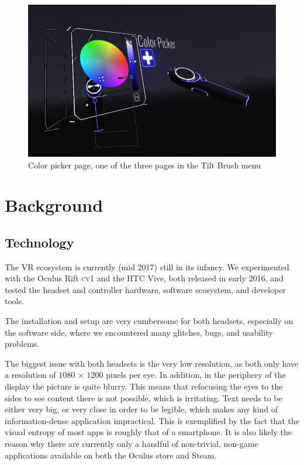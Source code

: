 \documentclass{tufte-book} %
\begin{document}
\begin{figure}
  \includegraphics{tiltbrushmenu.png}
  \caption{Color picker page, one of the three pages in the Tilt Brush menu}
  \label{fig:tiltbrushmenu}
\end{figure}



\chapter{Background}
\label{ch:background}

\section{Technology}
The \textsc{VR} ecosystem is currently (mid 2017) still in its infancy. We experimented with the Oculus Rift \textsc{cv1} and the \textsc{HTC} Vive, both released in early 2016, and tested the headset and controller hardware, software ecosystem, and developer tools.

The installation and setup are very cumbersome for both headsets, especially on the software side, where we encountered many glitches, bugs, and usability problems.

The biggest issue with both headsets is the very low resolution, as both only have a resolution of $1080$ $\times$ $1200$ pixels per eye. In addition, in the periphery of the display the picture is quite blurry. This means that refocusing the eyes to the sides to see content there is not possible, which is irritating. Text needs to be either very big, or very close in order to be legible, which makes any kind of information-dense application impractical. This is exemplified by the fact that the visual entropy of most apps is roughly that of a smartphone. It is also likely the reason why there are currently only a handful of non-trivial, non-game applications available on both the Oculus store and Steam.
\end{document}
